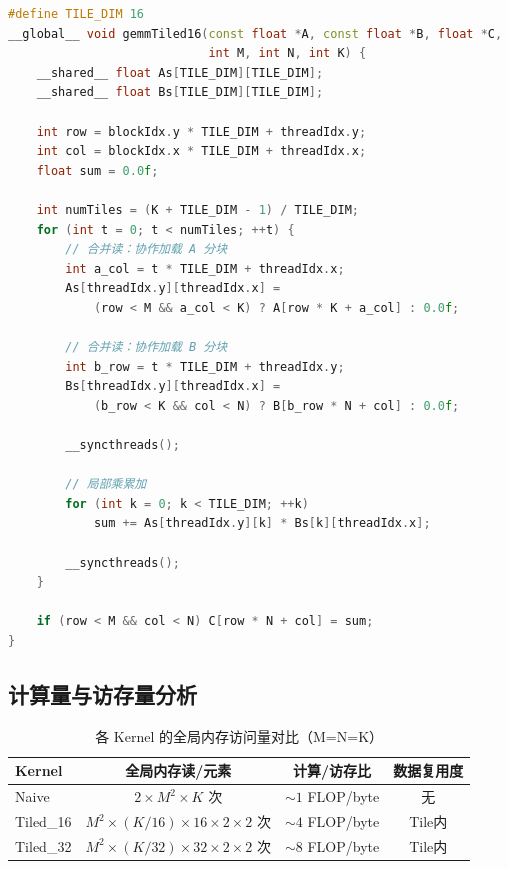 \documentclass[UTF8,a4paper,12pt,fontset=none]{ctexart}
\begin{document}
\begin{lstlisting}[language=C++, caption={共享内存分块 GEMM Kernel (TILE=16 示例)}]
#define TILE_DIM 16
__global__ void gemmTiled16(const float *A, const float *B, float *C,
                            int M, int N, int K) {
    __shared__ float As[TILE_DIM][TILE_DIM];
    __shared__ float Bs[TILE_DIM][TILE_DIM];

    int row = blockIdx.y * TILE_DIM + threadIdx.y;
    int col = blockIdx.x * TILE_DIM + threadIdx.x;
    float sum = 0.0f;

    int numTiles = (K + TILE_DIM - 1) / TILE_DIM;
    for (int t = 0; t < numTiles; ++t) {
        // 合并读：协作加载 A 分块
        int a_col = t * TILE_DIM + threadIdx.x;
        As[threadIdx.y][threadIdx.x] =
            (row < M && a_col < K) ? A[row * K + a_col] : 0.0f;

        // 合并读：协作加载 B 分块
        int b_row = t * TILE_DIM + threadIdx.y;
        Bs[threadIdx.y][threadIdx.x] =
            (b_row < K && col < N) ? B[b_row * N + col] : 0.0f;

        __syncthreads();

        // 局部乘累加
        for (int k = 0; k < TILE_DIM; ++k)
            sum += As[threadIdx.y][k] * Bs[k][threadIdx.x];

        __syncthreads();
    }

    if (row < M && col < N) C[row * N + col] = sum;
}
\end{lstlisting}

\subsection{计算量与访存量分析}

\begin{table}[H]
  \centering
  \caption{各 Kernel 的全局内存访问量对比（M=N=K）}
  \label{tab:memory}
  \begin{tabular}{lccc}
    \toprule
    Kernel & 全局内存读/元素 & 计算/访存比 & 数据复用度 \\
    \midrule
    Naive & $2 \times M^2 \times K$ 次 & $\sim 1$ FLOP/byte & 无 \\
    Tiled\_16 & $M^2 \times (K/16) \times 16 \times 2 \times 2$ 次 & $\sim 4$ FLOP/byte & Tile内 \\
    Tiled\_32 & $M^2 \times (K/32) \times 32 \times 2 \times 2$ 次 & $\sim 8$ FLOP/byte & Tile内 \\
    \bottomrule
  \end{tabular}
\end{table}
\end{document}
